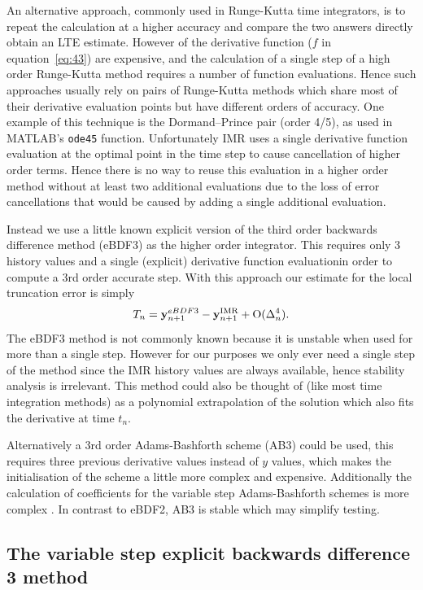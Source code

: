 An alternative approach, commonly used in Runge-Kutta time integrators, is to repeat the calculation at a higher accuracy and compare the two answers directly obtain an LTE estimate.
However of the derivative function ($f$ in equation~\eqref{eq:43}) are expensive,  and the calculation of a single step of a high order Runge-Kutta method requires a number of function evaluations.
Hence such approaches usually rely on pairs of Runge-Kutta methods which share most of their derivative evaluation points but have different orders of accuracy.
One example of this technique is the Dormand–Prince pair (order 4/5), as used in MATLAB's \texttt{ode45} function.
Unfortunately IMR uses a single derivative function evaluation at the optimal point in the time step to cause cancellation of higher order terms.
Hence there is no way to reuse this evaluation in a higher order method without at least two additional evaluations due to the loss of error cancellations that would be caused by adding a single additional evaluation.

Instead we use a little known explicit version of the third order backwards difference method (eBDF3) as the higher order integrator.
This requires only 3 history values and a single (explicit) derivative function evaluationin order to compute a 3rd order accurate step.
With this approach our estimate for the local truncation error is simply
\begin{equation}
  \label{eq:aimr-lte-est}
  T_n = \mathbf{y}_{n+1}^{eBDF3} - \mathbf{y}_{n+1}^{\text{IMR}} + \text{O}(\Delta_{n}^4).
\end{equation}
The eBDF3 method is not commonly known because it is unstable when used for more than a single step.
However for our purposes we only ever need a single step of the method since the IMR history values are always available, hence stability analysis is irrelevant.
This method could also be thought of (like most time integration methods) as a polynomial extrapolation of the solution which also fits the derivative at time $t_n$.

Alternatively a 3rd order Adams-Bashforth scheme (AB3) could be used, this requires three previous derivative values instead of $y$ values, which makes the initialisation of the scheme a little more complex and expensive. 
Additionally the calculation of coefficients for the variable step Adams-Bashforth schemes is more complex \cite[pg. 400]{HairerNorsettWanner}.
In contrast to eBDF2, AB3 is stable which may simplify testing.


\subsection{The variable step explicit backwards difference 3 method}

